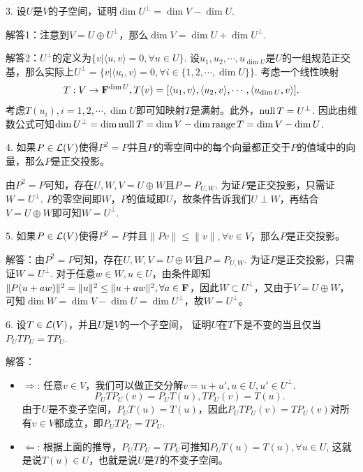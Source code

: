 \documentclass[hyperref,]{ctexart}
\begin{document}
\bigskip

\noindent{} 3.
设\(U\)是\(V\)的子空间，证明\(\dim U^\perp = \dim V - \dim U\).

\smallskip

\noindent{}
解答1：注意到\(V = U\oplus U^\perp\)，那么\(\dim V=\dim U+\dim U^\perp\).

\smallskip

\noindent{}
解答2：\(U^\perp\)的定义为\(\{v| \langle u,v\rangle=0,\forall u\in U\}\).
设\(u_1,u_2,\cdots,u_{\dim U}\)是\(U\)的一组规范正交基，那么实际上\(U^\perp = \{v| \langle u_i,v\rangle=0,\forall i\in\{1,2,\cdots,\dim U\}\}\).
考虑一个线性映射
\[T:V\rightarrow \mathbf{F}^{\mathrm{dim}\, U}, T(v) =[\langle u_1,v\rangle, \langle u_2,v\rangle,\cdots, \langle u_{\mathrm{dim}\, U},v\rangle].\]
考虑\(T(u_i),i=1,2,\cdots,\dim U\)即可知映射\(T\)是满射。此外，\(\mathrm{null}\, T = U^\perp\).
因此由维数公式可知\(\mathrm{dim}\, U^\perp=\mathrm{dim}\, \mathrm{null}\, T = \mathrm{dim}\, V-\mathrm{dim}\, \mathrm{range}\, T=\mathrm{dim}\, V-\mathrm{dim}\, U\).

\bigskip

\noindent{} 4.
如果\(P\in \mathcal{L}(V)\)使得\(P^2=P\)并且\(P\)的零空间中的每个向量都正交于\(P\)的值域中的向量，那么\(P\)是正交投影。

\smallskip

\noindent{} 由\(P^2=P\)可知，存在\(U,W, V=U\oplus W\)且\(P=P_{U,W}\).
为证\(P\)是正交投影，只需证\(W=U^\perp\).
\(P\)的零空间即\(W\)，\(P\)的值域即\(U\)，故条件告诉我们\(U\perp W\)，再结合\(V=U\oplus W\)即可知\(W=U^\perp\).

\bigskip

\noindent{} 5.
如果\(P\in \mathcal{L}(V)\)使得\(P^2=P\)并且\(\|Pv\|\le\|v\|,\forall v\in V\)，那么\(P\)是正交投影。

\smallskip

\noindent{}
解答：由\(P^2=P\)可知，存在\(U,W, V=U\oplus W\)且\(P=P_{U,W}\).
为证\(P\)是正交投影，只需证\(W=U^\perp\).
对于任意\(w\in W,u\in U\)，由条件即知\(\|P(u+aw)\|^2=\|u\|^2\le \|u+aw\|^2,\forall a\in \mathbf{F}\)，因此\(W\subset U^\perp\)，又由于\(V=U\oplus W\)，可知\(\dim W =\dim V-\dim U=\dim U^\perp\)，故\(W=U^\perp\)。

\bigskip

\noindent{} 6. 设\(T\in\mathcal{L}(V)\)，并且\(U\)是\(V\)的一个子空间，
证明\(U\)在\(T\)下是不变的当且仅当\(P_UTP_U=TP_U\).

\smallskip

\noindent{} 解答：

\begin{itemize}
\item
  \(\Rightarrow\):
  任意\(v\in V\)，我们可以做正交分解\(v=u+u', u\in U, u'\in U^\perp\).
  \[P_UTP_U(v) = P_UT(u),TP_U(v)=T(u).\]
  由于\(U\)是不变子空间，\(P_UT(u)=T(u)\)，因此\(P_UTP_U(v)=TP_U(v)\)对所有\(v\in V\)都成立，即\(P_UTP_U=TP_U\).
\item
  \(\Leftarrow\):
  根据上面的推导，\(P_UTP_U=TP_U\)可推知\(P_UT(u)=T(u),\forall u \in U\),
  这就是说\(T(u)\in U\)，也就是说\(U\)是\(T\)的不变子空间。
\end{itemize}
\end{document}

